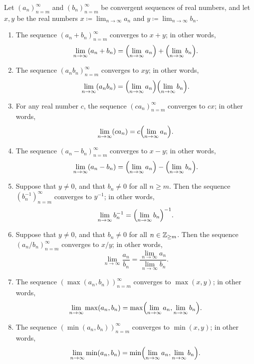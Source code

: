 \setcounter{thm}{18}
\begin{thm}\label{i:6.1.19}
  Let \((a_n)_{n = m}^\infty\) and \((b_n)_{n = m}^\infty\) be convergent sequences of real numbers, and let \(x, y\) be the real numbers \(x \coloneqq \lim_{n \to \infty} a_n\) and \(y \coloneqq \lim_{n \to \infty} b_n\).
  \begin{enumerate}
    \item\label{i:6.1.19.a} The sequence \((a_n + b_n)_{n = m}^\infty\) converges to \(x + y\);
    in other words,
    \[
      \lim_{n \to \infty} (a_n + b_n) = \pa{\lim_{n \to \infty} a_n} + \pa{\lim_{n \to \infty} b_n}.
    \]
    \item\label{i:6.1.19.b} The sequence \((a_n b_n)_{n = m}^\infty\) converges to \(xy\);
    in other words,
    \[
      \lim_{n \to \infty} (a_n b_n) = \pa{\lim_{n \to \infty} a_n} \pa{\lim_{n \to \infty} b_n}.
    \]
    \item\label{i:6.1.19.c} For any real number \(c\), the sequence \((c a_n)_{n = m}^\infty\) converges to \(cx\);
    in other words,
    \[
      \lim_{n \to \infty} (c a_n) = c \pa{\lim_{n \to \infty} a_n}.
    \]
    \item\label{i:6.1.19.d} The sequence \((a_n - b_n)_{n = m}^\infty\) converges to \(x - y\);
    in other words,
    \[
      \lim_{n \to \infty} (a_n - b_n) = \pa{\lim_{n \to \infty} a_n} - \pa{\lim_{n \to \infty} b_n}.
    \]
    \item\label{i:6.1.19.e} Suppose that \(y \neq 0\), and that \(b_n \neq 0\) for all \(n \geq m\).
    Then the sequence \((b_n^{-1})_{n = m}^\infty\) converges to \(y^{-1}\);
    in other words,
    \[
      \lim_{n \to \infty} b_n^{-1} = \pa{\lim_{n \to \infty} b_n}^{-1}.
    \]
    \item\label{i:6.1.19.f} Suppose that \(y \neq 0\), and that \(b_n \neq 0\) for all \(n \in \mathbb{Z}_{\geq m}\).
    Then the sequence \((a_n / b_n)_{n = m}^\infty\) converges to \(x / y\);
    in other words,
    \[
      \lim_{n \to \infty} \dfrac{a_n}{b_n} = \dfrac{\lim_{n \to \infty} a_n}{\lim_{n \to \infty} b_n}.
    \]
    \item\label{i:6.1.19.g} The sequence \((\max(a_n, b_n))_{n = m}^\infty\) converges to \(\max(x, y)\);
    in other words,
    \[
      \lim_{n \to \infty} \max(a_n, b_n) = \max\pa{\lim_{n \to \infty} a_n, \lim_{n \to \infty} b_n}.
    \]
    \item\label{i:6.1.19.h} The sequence \((\min(a_n, b_n))_{n = m}^\infty\) converges to \(\min(x, y)\);
    in other words,
    \[
      \lim_{n \to \infty} \min(a_n, b_n) = \min\pa{\lim_{n \to \infty} a_n, \lim_{n \to \infty} b_n}.
    \]
  \end{enumerate}
\end{thm}

